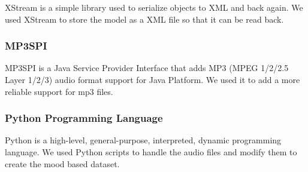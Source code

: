XStream is a simple library used to serialize objects to XML and back again.
We used XStream to store the model as a XML file so that it can be read back. 

\subsubsection{MP3SPI}
MP3SPI is a Java Service Provider Interface that adds MP3 (MPEG 1/2/2.5 Layer 1/2/3) audio format support for Java Platform.
We used it to add a more reliable support for mp3 files.

\subsubsection{Python Programming Language}

Python is a high-level, general-purpose, interpreted, dynamic programming language.
We used Python scripts to handle the audio files and modify them to create the mood based dataset.

